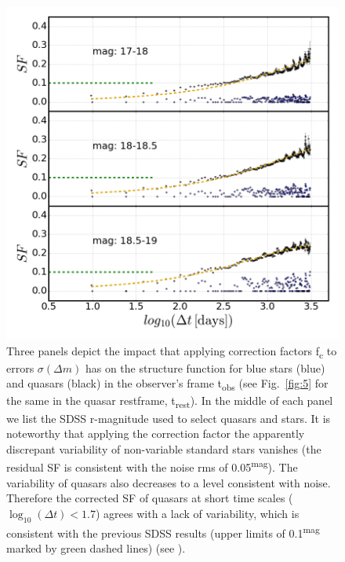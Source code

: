 \documentclass[fleqn,usenatbib]{mnras}  %
\begin{document}
\begin{figure}
\label{fig:4}
 \includegraphics[width=1.1\columnwidth, center]{Fig_4_SF_QSO_starsB_r_cut.png}
 \caption{Three panels depict the impact that applying correction factors f\textsubscript{c} to errors $\sigma(\Delta m)$ has on the structure function for blue stars (blue) and quasars (black) in the observer's frame t\textsubscript{obs} (see Fig.~\ref{fig:5} for the same in the quasar restframe, t\textsubscript{rest}). In the middle of each panel we list the SDSS r-magnitude used to select quasars and stars. It is noteworthy that applying the correction factor the apparently discrepant variability of non-variable standard stars  vanishes (the residual SF is consistent with the noise rms of 0.05\textsuperscript{mag}). The variability of quasars also decreases  to a level consistent with noise. Therefore the corrected SF of quasars at short time scales ($\log_{10}(\Delta t) < 1.7$) agrees with a lack of variability, which is consistent with the previous SDSS results (upper limits of 0.1\textsuperscript{mag} marked by green dashed lines) (see \citep{macleod2011}).}
\end{figure}
\end{document}
